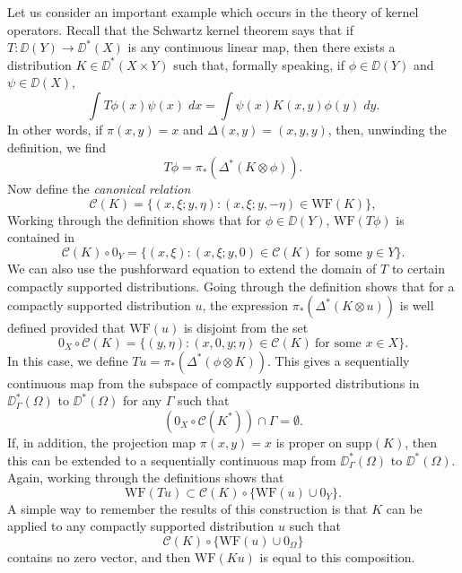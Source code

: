 Let us consider an important example which occurs in the theory of kernel operators. Recall that the Schwartz kernel theorem says that if $T: \DD(Y) \to \DD^*(X)$ is any continuous linear map, then there exists a distribution $K \in \DD^*(X \times Y)$ such that, formally speaking, if $\phi \in \DD(Y)$ and $\psi \in \DD(X)$,
%
\[ \int T\phi(x) \psi(x)\; dx = \int \psi(x) K(x,y) \phi(y)\; dy. \]
%
In other words, if $\pi(x,y) = x$ and $\Delta(x,y) = (x,y,y)$, then, unwinding the definition, we find
%
\[ T\phi = \pi_*(\Delta^* (K \otimes \phi)). \]
%
Now define the \emph{canonical relation}
%
\[ \mathcal{C}(K) = \{ (x,\xi;y,\eta) : (x,\xi;y,-\eta) \in \text{WF}(K) \}, \]
%
Working through the definition shows that for $\phi \in \DD(Y)$, $\text{WF}(T\phi)$ is contained in
%
\[ \mathcal{C}(K) \circ 0_Y = \{ (x,\xi) : (x,\xi;y, 0) \in \mathcal{C}(K)\ \text{for some $y \in Y$} \}. \]
%
We can also use the pushforward equation to extend the domain of $T$ to certain compactly supported distributions. Going through the definition shows that for a compactly supported distribution $u$, the expression $\pi_*(\Delta^*(K \otimes u))$ is well defined provided that $\text{WF}(u)$ is disjoint from the set
%
\[ 0_X \circ \mathcal{C}(K) = \{ (y,\eta) : (x,0,y;\eta) \in \mathcal{C}(K)\ \text{for some $x \in X$} \}. \]
%
In this case, we define $Tu = \pi_*(\Delta^*(\phi \otimes K))$. This gives a sequentially continuous map from the subspace of compactly supported distributions in $\DD^*_\Gamma(\Omega)$ to $\DD^*(\Omega)$ for any $\Gamma$ such that
%
\[ (0_X \circ \mathcal{C}(K^*)) \cap \Gamma = \emptyset. \]
%
If, in addition, the projection map $\pi(x,y) = x$ is proper on $\text{supp}(K)$, then this can be extended to a sequentially continuous map from $\DD^*_\Gamma(\Omega)$ to $\DD^*(\Omega)$. Again, working through the definitions shows that
%
\[ \text{WF}(Tu) \subset \mathcal{C}(K) \circ \{ \text{WF}(u) \cup 0_Y \}. \]
%
A simple way to remember the results of this construction is that $K$ can be applied to any compactly supported distribution $u$ such that
%
\[ \mathcal{C}(K) \circ \{ \text{WF}(u) \cup 0_\Omega \} \]
%
contains no zero vector, and then $\text{WF}(Ku)$ is equal to this composition.

